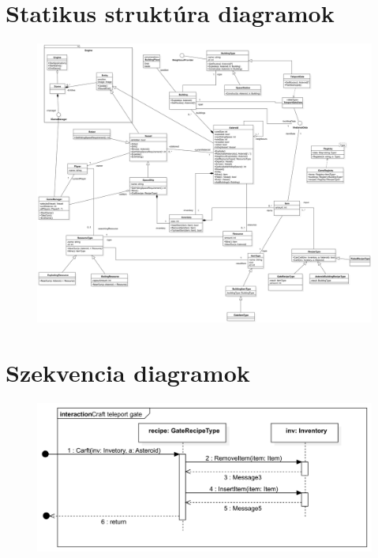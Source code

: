 \documentclass[../../projlab]{subfiles}
\begin{document}
\section{Statikus struktúra diagramok}
\begin{figure}[H]
	\includegraphics[width=1\textwidth]{docs/2_Project/svg/Design Model!Classes_1.png}
	\centering
\end{figure}

\section{Szekvencia diagramok}
\begin{figure}[H]
	\includegraphics[width=1\textwidth]{docs/2_Project/svg/Design Model!Crafting!Craft teleport gate!Craft teleport gate_19.png}
	\centering
\end{figure}
\end{document}
